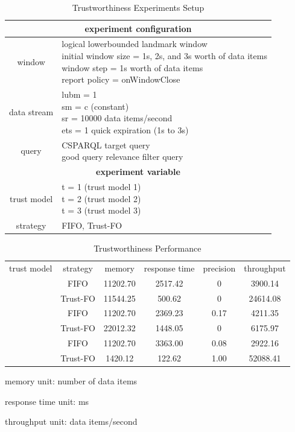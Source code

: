 \begin{table}[!htbp]
	\centering
    \caption{Trustworthiness Experiments Setup}
    \label{tab:6-tes}
    \begin{tabular}{|c|l|} \hline
    \multicolumn{2}{|c|}{\textbf{experiment configuration}} \\ \hline
    window & \makecell[l]{logical lowerbounded landmark window \\ initial window size = 1s, 2s, and 3s worth of data items \\ window step = 1s worth of data items \\ report policy = onWindowClose} \\ \hline
    data stream & \makecell[l]{lubm = 1 \\ sm = c (constant) \\ sr = 10000 data items/second \\ ets = 1 quick expiration (1s to 3s)} \\ \hline
    query & \makecell[l]{CSPARQL target query \\ good query relevance filter query} \\ \hline
    \multicolumn{2}{|c|}{\textbf{experiment variable}} \\ \hline
    trust model & \makecell[l]{t = 1 (trust model 1) \\ t = 2 (trust model 2) \\ t = 3 (trust model 3)} \\ \hline
    strategy & FIFO, Trust-FO  \\ \hline
    \end{tabular}
\end{table}

\begin{table}[!htbp]
	\centering
    \caption{Trustworthiness Performance}
    \label{tab:6-tp}
    \begin{tabular}{|c||c|c|c|c|c|} \hline
    trust model & strategy & memory & response time & precision & throughput \\ \hhline{|=#=|=|=|=|=|}
    \multirow{2}{*}{Model 1} & FIFO & 11202.70 & 2517.42 & 0 & 3900.14 \\ \cline{2-6} 
    						 & Trust-FO & 11544.25 & 500.62 & 0 & 24614.08 \\ \hhline{|=#=|=|=|=|=|}
    \multirow{2}{*}{Model 2} & FIFO & 11202.70 & 2369.23 & 0.17 & 4211.35 \\ \cline{2-6} 
    						 & Trust-FO & 22012.32 & 1448.05 & 0 & 6175.97 \\ \hhline{|=#=|=|=|=|=|}
    \multirow{2}{*}{Model 3} & FIFO & 11202.70 & 3363.00 & 0.08 & 2922.16 \\ \cline{2-6} 
    						 & Trust-FO & 1420.12 & 122.62 & 1.00 & 52088.41\\ \hline 
    \end{tabular}
    \begin{tablenotes}
 		\item memory unit: number of data items
 		\item response time unit: ms
 		\item throughput unit: data items/second
    \end{tablenotes}
\end{table}

